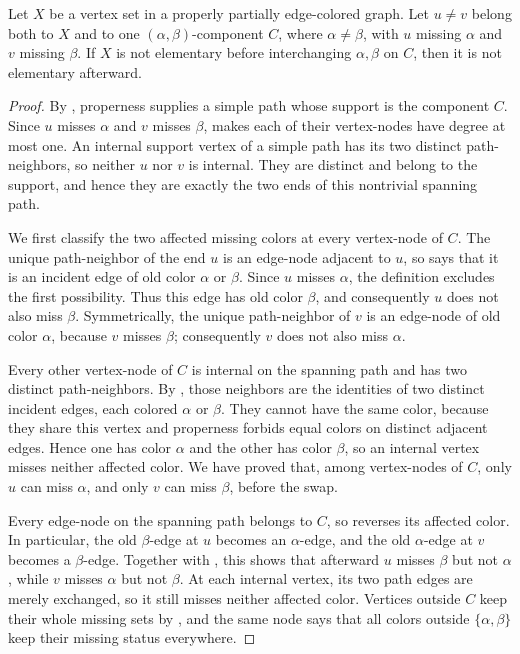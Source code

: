 \begin{helper}
Let \(X\) be a vertex set in a properly partially edge-colored graph.
Let \(u\ne v\) belong both to \(X\) and to one
\((\alpha,\beta)\)-component \(C\), where \(\alpha\ne\beta\), with
\(u\) missing \(\alpha\) and \(v\) missing \(\beta\).  If \(X\) is
not elementary before interchanging \(\alpha,\beta\) on \(C\), then it
is not elementary afterward.
\end{helper}
\begin{proof}
By , properness
 supplies a simple path whose support is
the component  \(C\).  Since \(u\) misses
\(\alpha\) and \(v\) misses \(\beta\),
 makes each of their vertex-nodes
have degree at most one.  An internal support vertex of a simple path
has its two distinct path-neighbors, so neither \(u\) nor \(v\) is
internal.  They are distinct and belong to the support, and hence they
are exactly the two ends of this nontrivial spanning path.

We first classify the two affected missing colors at every vertex-node
of \(C\).  The unique path-neighbor of the end \(u\) is an edge-node
adjacent to \(u\),
so  says that it is an incident edge of
old color \(\alpha\) or \(\beta\).  Since \(u\) misses \(\alpha\), the
definition  excludes the first possibility.
Thus this edge has old color \(\beta\), and consequently \(u\) does not
also miss \(\beta\).  Symmetrically, the unique path-neighbor of \(v\)
is an edge-node of old color \(\alpha\), because \(v\) misses
\(\beta\); consequently \(v\) does not also miss \(\alpha\).

Every other vertex-node of \(C\) is internal on the spanning path and
has two distinct path-neighbors.  By
, those neighbors are the identities of
two distinct incident edges, each colored \(\alpha\) or \(\beta\).
They cannot have the same color, because they share this vertex and
properness  forbids equal colors on
distinct adjacent edges.  Hence one has color \(\alpha\) and the other
has color \(\beta\), so an internal vertex misses neither affected
color.  We have proved that, among vertex-nodes of \(C\), only \(u\)
can miss \(\alpha\), and only \(v\) can miss \(\beta\), before the
swap.

Every edge-node on the spanning path belongs to \(C\), so
 reverses its affected color.  In
particular, the old \(\beta\)-edge at \(u\) becomes an \(\alpha\)-edge,
and the old \(\alpha\)-edge at \(v\) becomes a \(\beta\)-edge.  Together
with , this shows that
afterward \(u\) misses \(\beta\) but not \(\alpha\), while \(v\) misses
\(\alpha\) but not \(\beta\).  At each internal vertex, its two path
edges are merely exchanged, so it still misses neither affected color.
Vertices outside \(C\) keep their whole missing sets by
, and the same node says
that all colors outside \(\{\alpha,\beta\}\) keep their missing status
everywhere.


\end{proof}
